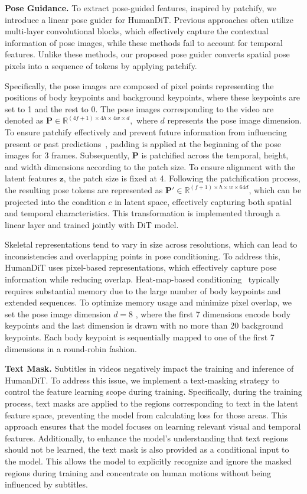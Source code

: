 \noindent\textbf{Pose Guidance.} To extract pose-guided features, inspired by patchify, we introduce a linear pose guider for HumanDiT. Previous approaches often utilize multi-layer convolutional blocks, which effectively capture the contextual information of pose images, while these methods fail to account for temporal features. Unlike these methods, our proposed pose guider converts spatial pose pixels into a sequence of tokens by applying patchify. 

Specifically, the pose images are composed of pixel points representing the positions of body keypoints and background keypoints, where these keypoints are set to 1 and the rest to 0. The pose images corresponding to the video are denoted as  $
    \mathbf{P} \in \mathbb{R}^{(4f+1)\times4h\times4w\times d},
$ where $d$ represents the pose image dimension. To ensure patchify effectively and prevent future information from influencing present or past predictions~\cite{yang2024cogvideox}, padding is applied at the beginning of the pose images for $3$ frames. Subsequently, $ \mathbf{P} $ is patchified across the temporal, height, and width dimensions according to the patch size. To ensure alignment with the latent features $ \mathbf{z} $, the patch size is fixed at 4. Following the patchification process, the resulting pose tokens are represented as $  \mathbf{P}' \in \mathbb{R}^{(f+1) \times h \times w \times 64d} $, which can be projected into the condition $c$ in latent space, effectively capturing both spatial and temporal characteristics. This transformation is implemented through a linear layer and trained jointly with DiT model.

Skeletal representations tend to vary in size across resolutions, which can lead to inconsistencies and overlapping points in pose conditioning. To address this, HumanDiT uses pixel-based representations, which effectively capture pose information while reducing overlap. Heat-map-based conditioning~\cite{wang2021one} typically requires substantial memory due to the large number of body keypoints and extended sequences. To optimize memory usage and minimize pixel overlap, we set the pose image dimension  $d = 8$ , where the first 7 dimensions encode body keypoints and the last dimension is drawn with no more than 20 background keypoints. Each body keypoint is sequentially mapped to one of the first 7 dimensions in a round-robin fashion.

\noindent\textbf{Text Mask.} Subtitles in videos negatively impact the training and inference of HumanDiT. 
To address this issue, we implement a text-masking strategy to control the feature learning scope during training. Specifically, during the training process, text masks are applied to the regions corresponding to text in the latent feature space, preventing the model from calculating loss for those areas. This approach ensures that the model focuses on learning relevant visual and temporal features. Additionally, to enhance the model’s understanding that text regions should not be learned, the text mask is also provided as a conditional input to the model. This allows the model to explicitly recognize and ignore the masked regions during training and concentrate on human motions without being influenced by subtitles.

